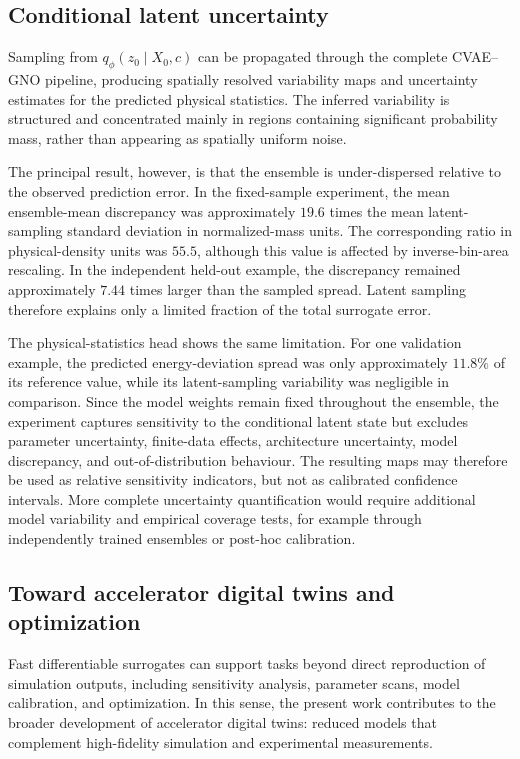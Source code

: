 \subsection{Conditional latent uncertainty}
\label{subsec:discussion_conditional_latent_uncertainty}

Sampling from \(q_{\phi}(z_0\mid X_0,c)\) can be propagated through the complete CVAE--GNO pipeline, producing spatially resolved variability maps and uncertainty estimates for the predicted physical statistics. The inferred variability is structured and concentrated mainly in regions containing significant probability mass, rather than appearing as spatially uniform noise.

The principal result, however, is that the ensemble is under-dispersed relative to the observed prediction error. In the fixed-sample experiment, the mean ensemble-mean discrepancy was approximately \(19.6\) times the mean latent-sampling standard deviation in normalized-mass units. The corresponding ratio in physical-density units was \(55.5\), although this value is affected by inverse-bin-area rescaling. In the independent held-out example, the discrepancy remained approximately \(7.44\) times larger than the sampled spread. Latent sampling therefore explains only a limited fraction of the total surrogate error.

The physical-statistics head shows the same limitation. For one validation example, the predicted energy-deviation spread was only approximately \(11.8\%\) of its reference value, while its latent-sampling variability was negligible in comparison. Since the model weights remain fixed throughout the ensemble, the experiment captures sensitivity to the conditional latent state but excludes parameter uncertainty, finite-data effects, architecture uncertainty, model discrepancy, and out-of-distribution behaviour. The resulting maps may therefore be used as relative sensitivity indicators, but not as calibrated confidence intervals. More complete uncertainty quantification would require additional model variability and empirical coverage tests, for example through independently trained ensembles or post-hoc calibration.

\subsection{Toward accelerator digital twins and optimization}
\label{subsec:digital_twins_optimization}

Fast differentiable surrogates can support tasks beyond direct reproduction of simulation outputs, including sensitivity analysis, parameter scans, model calibration, and optimization. In this sense, the present work contributes to the broader development of accelerator digital twins: reduced models that complement high-fidelity simulation and experimental measurements.

